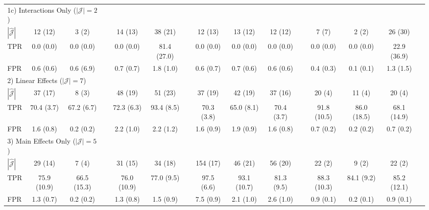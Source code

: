\documentclass[12pt,letter]{article}\usepackage[]{graphicx}\usepackage[]{color}
\newcommand{\mcl}[2]{\multicolumn{#1}{l}{#2}}
\begin{document}
\begin{table}
\begin{tabular}{lcccccccccccccc}
\hline
\mcl{3}{1c) Interactions Only ($|\mathcal{J}|=2$)}\\
$|\widehat{\mathcal{J}}|$ & 12 (12) & 3 (2)  & & 14 (13) & 38 (21)  & & 12 (13) & 13 (12) & 12 (12)  & & 7 (7) & 2 (2) & 26 (30) \\
TPR & 0.0 (0.0) & 0.0 (0.0)  & & 0.0 (0.0) & 81.4 (27.0)  & & 0.0 (0.0) & 0.0 (0.0) & 0.0 (0.0)  & & 0.0 (0.0) & 0.0 (0.0) & 22.9 (36.9) \\
FPR & 0.6 (0.6) & 0.6 (6.9)  & & 0.7 (0.7) & 1.8 (1.0)  & & 0.6 (0.7) & 0.7 (0.6) & 0.6 (0.6)  & & 0.4 (0.3) & 0.1 (0.1) & 1.3 (1.5) \\
\hline
\mcl{3}{2) Linear Effects ($|\mathcal{J}|=7$)}\\
$|\widehat{\mathcal{J}}|$ & 37 (17) & 8 (3)  & & 48 (19) & 51 (23)  & & 37 (19) & 42 (19) & 37 (16)  & & 20 (4) & 11 (4) & 20 (4) \\
TPR & 70.4 (3.7) & 67.2 (6.7)  & & 72.3 (6.3) & 93.4 (8.5) &  & 70.3 (3.8) & 65.0 (8.1) & 70.4 (3.7)  & & 91.8 (10.5) & 86.0 (18.5) & 68.1 (14.9) \\
FPR & 1.6 (0.8) & 0.2 (0.2)  & & 2.2 (1.0) & 2.2 (1.2)  & & 1.6 (0.9) & 1.9 (0.9) & 1.6 (0.8)  & & 0.7 (0.2) & 0.2 (0.2) & 0.7 (0.2) \\
\hline
\mcl{3}{3) Main Effects Only ($|\mathcal{J}|=5$)}\\
$|\widehat{\mathcal{J}}|$ & 29 (14) & 7 (4)  & & 31 (15) & 34 (18)  & & 154 (17) & 46 (21) & 56 (20) & &  22 (2) & 9 (2) & 22 (2) \\
TPR & 75.9 (10.9) & 66.5 (15.3) & &  76.0 (10.9) & 77.0 (9.5)  & & 97.5 (6.6) & 93.1 (10.7) & 81.3 (9.5) & &  88.3 (10.3) & 84.1 (9.2) & 85.2 (12.1) \\
FPR & 1.3 (0.7) & 0.2 (0.2) & &  1.3 (0.8) & 1.5 (0.9)  & & 7.5 (0.9) & 2.1 (1.0) & 2.6 (1.0)  & & 0.9 (0.1) & 0.2 (0.1) & 0.9 (0.1) \\
\hline
	\end{tabular}
\end{table}
\end{document}
